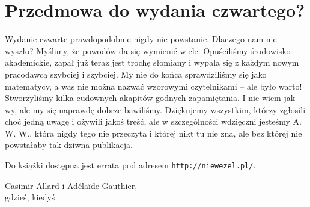 \newpage
\section*{Przedmowa do wydania czwartego?}

Wydanie czwarte prawdopodobnie nigdy nie powstanie.
Dlaczego nam nie wyszło? 
Myślimy, że powodów da się wymienić wiele.
Opuściliśmy środowisko akademickie, zapał już teraz jest trochę słomiany i wypala się z każdym nowym pracodawcą szybciej i szybciej.
My nie do końca sprawdziliśmy się jako matematycy, a was nie można nazwać wzorowymi czytelnikami -- ale było warto!
Stworzyliśmy kilka cudownych akapitów godnych zapamiętania.
I nie wiem jak wy, ale my się naprawdę dobrze bawiliśmy.
Dziękujemy wszystkim, którzy zgłosili choć jedną uwagę i ożywili jakoś treść, ale w szczególności wdzięczni jesteśmy A. W. W., która nigdy tego nie przeczyta i której nikt tu nie zna, ale bez której nie powstałaby tak dziwna publikacja.

Do książki dostępna jest errata pod adresem \texttt{http://niewezel.pl/}.

\begin{flushright}
Casimir Allard i Adélaïde Gauthier,\\gdzieś, kiedyś
\end{flushright}


